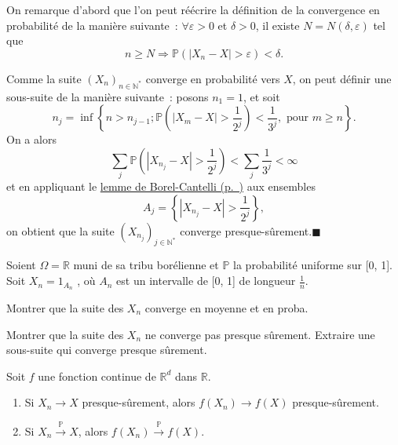 \begin{preuve}
On remarque d'abord que l'on peut réécrire la définition de la
convergence en probabilité de la manière suivante~:
\(\forall \varepsilon >0\) et \(\delta > 0\), il existe
\(N = N(\delta,\varepsilon)\) tel que
\[n\geq N \Rightarrow \mathbb{P}(|X_n-X| > \varepsilon ) < \delta.\]

Comme la suite \((X_n)_{n\in \mathbb{N}^\ast}\) converge en probabilité
vers \(X\), on peut définir une sous-suite de la manière suivante~:
posons \(n_1 = 1\), et soit
\[n_j = \inf \left\{ n > n_{j-1} ; \mathbb{P}\left(|X_m - X| > \frac{1}{2^j} \right) < \frac{1}{3^j}, \text{ pour } m \geq n \right\}.\]
On a alors
\[\sum_j \mathbb{P}\left(|X_{n_j} - X| > \frac{1}{2^j} \right) < \sum_j \frac{1}{3^j} < \infty\]
et en appliquant le \protect\hyperref[IV-BC]{lemme de
Borel-Cantelli (p.~\pageref*{IV-BC})} aux ensembles
\[A_j =\left\{|X_{n_{j}} - X| > \frac{1}{2^j} \right\},\] on obtient que
la suite \((X_{n_j})_{j\in \mathbb{N}^\ast}\) converge
presque-sûrement.\hfill$\blacksquare$
\end{preuve}

\label{IV-ia}
Soient \(\Omega = \mathbb{R}\) muni de sa tribu borélienne et
\(\mathbb{P}\) la probabilité uniforme sur {[}0, 1{]}. Soit
\(X_n = 1_{A_n}\) , où \(A_n\) est un intervalle de {[}0, 1{]} de
longueur \(\frac{1}{n}\).

Montrer que la suite des \(X_n\) converge en moyenne et en
proba.

\label{IV-ia2}
Montrer que la suite des \(X_n\) ne converge pas presque sûrement.
Extraire une sous-suite qui converge presque
sûrement.

\begin{proposition}[{Continuité}]\label{IV-propconv4}

Soit \(f\) une fonction continue de \(\mathbb{R}^d\) dans
\(\mathbb{R}\).

\begin{enumerate}
\def\labelenumi{\arabic{enumi}.}
\tightlist
\item
  Si \(X_n \to X\) presque-sûrement, alors \(f(X_n) \to f(X)\)
  presque-sûrement.
\item
  Si \(X_n \xrightarrow{\mathbb{P}} X\), alors
  \(f(X_n) \xrightarrow{\mathbb{P}} f(X)\).
\end{enumerate}
\end{proposition}

